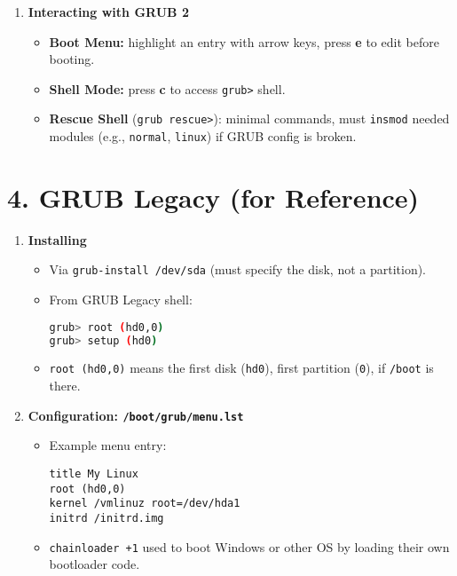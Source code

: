 \documentclass[a4paper]{report}
\begin{document}
\begin{enumerate}
    \item \textbf{Interacting with GRUB 2}
    \begin{itemize}
        \item \textbf{Boot Menu:} highlight an entry with arrow keys, press \textbf{e} to edit before booting.
        \item \textbf{Shell Mode:} press \textbf{c} to access \texttt{grub>} shell.
        \item \textbf{Rescue Shell} (\texttt{grub rescue>}): minimal commands, must \texttt{insmod} needed modules (e.g., \texttt{normal}, \texttt{linux}) if GRUB config is broken.
    \end{itemize}
\end{enumerate}

\section*{4. GRUB Legacy (for Reference)}

\begin{enumerate}
    \item \textbf{Installing}
    \begin{itemize}
        \item Via \texttt{grub-install /dev/sda} (must specify the disk, not a partition).
        \item From GRUB Legacy shell:
        \begin{lstlisting}[language=bash]
grub> root (hd0,0)
grub> setup (hd0)
        \end{lstlisting}
        \item \texttt{root (hd0,0)} means the first disk (\texttt{hd0}), first partition (\texttt{0}), if \texttt{/boot} is there.
    \end{itemize}

    \item \textbf{Configuration: \texttt{/boot/grub/menu.lst}}
    \begin{itemize}
        \item Example menu entry:
        \begin{lstlisting}
title My Linux
root (hd0,0)
kernel /vmlinuz root=/dev/hda1
initrd /initrd.img
        \end{lstlisting}
        \item \texttt{chainloader +1} used to boot Windows or other OS by loading their own bootloader code.
    \end{itemize}
\end{enumerate}
\end{document}
